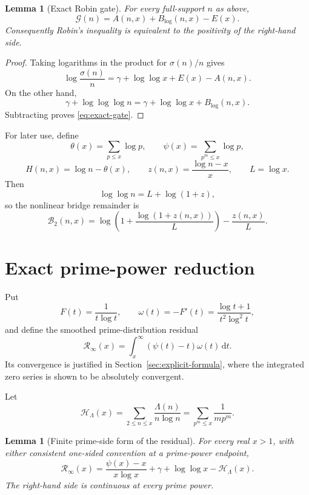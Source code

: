 \documentclass[11pt,a4paper]{article}
\numberwithin{equation}{section}
\newtheorem{lemma}[theorem]{Lemma}
\theoremstyle{definition}
\newcommand{\dd}{\,\mathrm{d}}
\newcommand{\Rinf}{\mathcal R_{\infty}}
\newcommand{\Btwo}{\mathcal B_{2}}
\newcommand{\Ggap}{\mathcal G}
\begin{document}
\begin{lemma}[Exact Robin gate]\label{lem:exact-gate}
For every full-support \(n\) as above,
\begin{equation}\label{eq:exact-gate}
  \Ggap(n)=A(n,x)+B_{\log}(n,x)-E(x).
\end{equation}
Consequently Robin's inequality is equivalent to the positivity of the
right-hand side.
\end{lemma}

\begin{proof}
Taking logarithms in the product for \(\sigma(n)/n\) gives
\[
  \log\frac{\sigma(n)}n
  =
  \gamma+\log\log x+E(x)-A(n,x).
\]
On the other hand,
\[
  \gamma+\log\log\log n
  =
  \gamma+\log\log x+B_{\log}(n,x).
\]
Subtracting proves \eqref{eq:exact-gate}.
\end{proof}

For later use, define
\[
  \theta(x)=\sum_{p\le x}\log p,
  \qquad
  \psi(x)=\sum_{p^m\le x}\log p,
\]
\[
  H(n,x)=\log n-\theta(x),
  \qquad
  z(n,x)=\frac{\log n-x}{x},
  \qquad
  L=\log x.
\]
Then
\[
  \log\log n=L+\log(1+z),
\]
so the nonlinear bridge remainder is
\begin{equation}\label{eq:B2-def}
  \Btwo(n,x)
  =
  \log\left(1+\frac{\log(1+z(n,x))}{L}\right)
  -\frac{z(n,x)}L.
\end{equation}

\section{Exact prime-power reduction}

Put
\[
  F(t)=\frac1{t\log t},
  \qquad
  \omega(t)=-F'(t)
  =\frac{\log t+1}{t^2\log^2t},
\]
and define the smoothed prime-distribution residual
\begin{equation}\label{eq:Rinf-def}
  \Rinf(x)=\int_x^\infty(\psi(t)-t)\omega(t)\dd t.
\end{equation}
Its convergence is justified in Section~\ref{sec:explicit-formula}, where the
integrated zero series is shown to be absolutely convergent.

Let
\[
  \mathcal H_\Lambda(x)
  =\sum_{2\le n\le x}\frac{\Lambda(n)}{n\log n}
  =\sum_{p^m\le x}\frac1{mp^m}.
\]

\begin{lemma}[Finite prime-side form of the residual]
\label{lem:Rinf-prime-side}
For every real \(x>1\), with either consistent one-sided convention at a
prime-power endpoint,
\begin{equation}\label{eq:Rinf-prime-side}
  \boxed{
  \Rinf(x)
  =\frac{\psi(x)-x}{x\log x}
  +\gamma+\log\log x-\mathcal H_\Lambda(x).
  }
\end{equation}
The right-hand side is continuous at every prime power.
\end{lemma}
\end{document}
